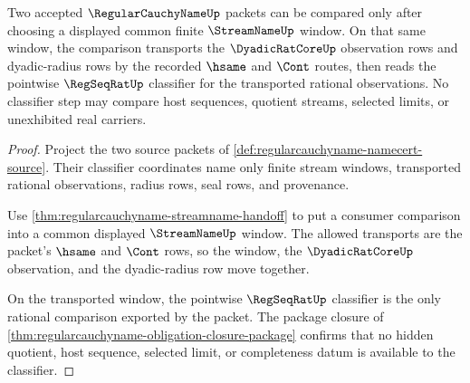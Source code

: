 \begin{theorem}
\label{thm:regularcauchyname-common-window-classifier-scope}
Two accepted $\RegularCauchyNameUp$ packets can be compared only after choosing a displayed common finite $\StreamNameUp$ window. On that same window, the comparison transports the $\DyadicRatCoreUp$ observation rows and dyadic-radius rows by the recorded $\hsame$ and $\Cont$ routes, then reads the pointwise $\RegSeqRatUp$ classifier for the transported rational observations. No classifier step may compare host sequences, quotient streams, selected limits, or unexhibited real carriers.
\end{theorem}
\begin{proof}
Project the two source packets of \autoref{def:regularcauchyname-namecert-source}. Their classifier coordinates name only finite stream windows, transported rational observations, radius rows, seal rows, and provenance.

Use \autoref{thm:regularcauchyname-streamname-handoff} to put a consumer comparison into a common displayed $\StreamNameUp$ window. The allowed transports are the packet's $\hsame$ and $\Cont$ rows, so the window, the $\DyadicRatCoreUp$ observation, and the dyadic-radius row move together.

On the transported window, the pointwise $\RegSeqRatUp$ classifier is the only rational comparison exported by the packet. The package closure of \autoref{thm:regularcauchyname-obligation-closure-package} confirms that no hidden quotient, host sequence, selected limit, or completeness datum is available to the classifier.
\end{proof}

